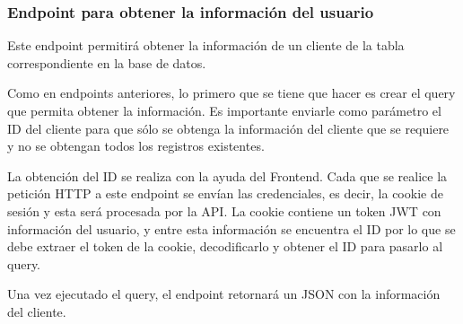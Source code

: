 \subsubsection{Endpoint para obtener la información del usuario}
Este endpoint permitirá obtener la información de un cliente de la tabla correspondiente en la base de datos.

Como en endpoints anteriores, lo primero que se tiene que hacer es crear el query que permita obtener la información. Es importante enviarle como parámetro el ID del cliente para que sólo se obtenga la información del cliente que se requiere y no se obtengan todos los registros existentes.

La obtención del ID se realiza con la ayuda del Frontend. Cada que se realice la petición HTTP a este endpoint se envían las credenciales, es decir, la cookie de sesión y esta será procesada por la API. La cookie contiene un token JWT con información del usuario, y entre esta información se encuentra el ID por lo que se debe extraer el token de la cookie, decodificarlo y obtener el ID para pasarlo al query.

Una vez ejecutado el query, el endpoint retornará un JSON con la información del cliente.